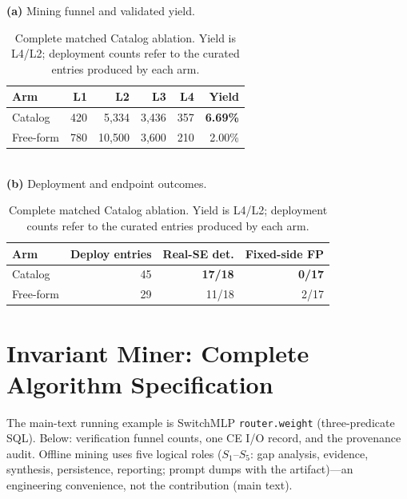 \documentclass[sigconf,nonacm]{acmart}
\begin{document}
\begin{table}[H]
\centering
\scriptsize
\setlength{\tabcolsep}{3pt}
\caption{Complete matched Catalog ablation. Yield is L4/L2; deployment counts
refer to the curated entries produced by each arm.}
\label{tab:catalog-direct-details}
{\scriptsize\textbf{(a)} Mining funnel and validated yield.}\\[2pt]
\begin{tabular}{@{}lrrrrr@{}}
\toprule
Arm & L1 & L2 & L3 & L4 & Yield \\
\midrule
Catalog   & 420 & 5{,}334  & 3{,}436 & 357 & \textbf{6.69\%} \\
Free-form & 780 & 10{,}500 & 3{,}600 & 210 & 2.00\% \\
\bottomrule
\end{tabular}\\[5pt]
{\scriptsize\textbf{(b)} Deployment and endpoint outcomes.}\\[2pt]
\begin{tabular}{@{}lrrr@{}}
\toprule
Arm & Deploy entries & Real-SE det. & Fixed-side FP \\
\midrule
Catalog   & 45 & \textbf{17/18} & \textbf{0/17} \\
Free-form & 29 & 11/18          & 2/17 \\
\bottomrule
\end{tabular}
\end{table}

\section{Invariant Miner: Complete Algorithm Specification}
\label{app:algorithm}
\label{app:case_study}

The main-text running example is SwitchMLP \texttt{router.weight}
(three-predicate SQL). Below: verification funnel counts, one CE I/O record,
and the provenance audit. Offline mining uses five logical roles
($S_1$--$S_5$: gap analysis, evidence, synthesis, persistence, reporting;
prompt dumps with the artifact)---an engineering convenience, not the
contribution (main text).
\end{document}
